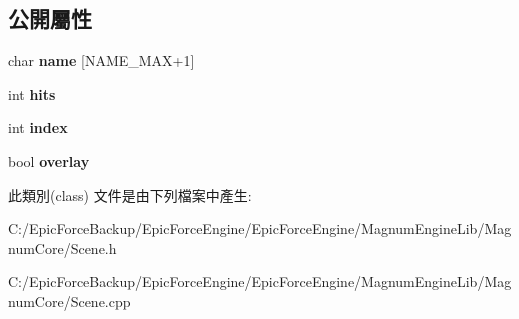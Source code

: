 \subsection*{公開屬性}
\begin{DoxyCompactItemize}
\item 
char {\bfseries name} \mbox{[}N\+A\+M\+E\+\_\+\+M\+AX+1\mbox{]}\hypertarget{class_magnum_1_1_scene_1_1_i_creator_a35f2b2ee02a90bb6326b56a839b66756}{}\label{class_magnum_1_1_scene_1_1_i_creator_a35f2b2ee02a90bb6326b56a839b66756}

\item 
int {\bfseries hits}\hypertarget{class_magnum_1_1_scene_1_1_i_creator_a5e38bb0576d089aac21f421755db8167}{}\label{class_magnum_1_1_scene_1_1_i_creator_a5e38bb0576d089aac21f421755db8167}

\item 
int {\bfseries index}\hypertarget{class_magnum_1_1_scene_1_1_i_creator_a300d3b815cd8275e5561f88a29aeb26c}{}\label{class_magnum_1_1_scene_1_1_i_creator_a300d3b815cd8275e5561f88a29aeb26c}

\item 
bool {\bfseries overlay}\hypertarget{class_magnum_1_1_scene_1_1_i_creator_a1ea35f6b894f7c285bc7296057eb4426}{}\label{class_magnum_1_1_scene_1_1_i_creator_a1ea35f6b894f7c285bc7296057eb4426}

\end{DoxyCompactItemize}


此類別(class) 文件是由下列檔案中產生\+:\begin{DoxyCompactItemize}
\item 
C\+:/\+Epic\+Force\+Backup/\+Epic\+Force\+Engine/\+Epic\+Force\+Engine/\+Magnum\+Engine\+Lib/\+Magnum\+Core/Scene.\+h\item 
C\+:/\+Epic\+Force\+Backup/\+Epic\+Force\+Engine/\+Epic\+Force\+Engine/\+Magnum\+Engine\+Lib/\+Magnum\+Core/Scene.\+cpp\end{DoxyCompactItemize}
